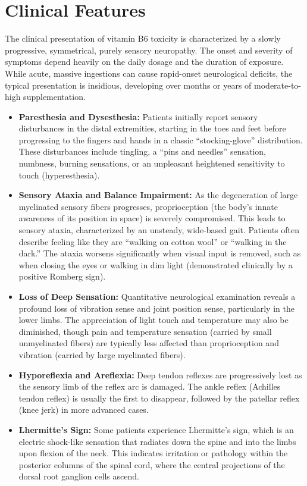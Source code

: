 \section*{Clinical Features}
The clinical presentation of vitamin B6 toxicity is characterized by a slowly progressive, symmetrical, purely sensory neuropathy. The onset and severity of symptoms depend heavily on the daily dosage and the duration of exposure. While acute, massive ingestions can cause rapid-onset neurological deficits, the typical presentation is insidious, developing over months or years of moderate-to-high supplementation.

\begin{itemize}
    \item \textbf{Paresthesia and Dysesthesia:} Patients initially report sensory disturbances in the distal extremities, starting in the toes and feet before progressing to the fingers and hands in a classic ``stocking-glove'' distribution. These disturbances include tingling, a ``pins and needles'' sensation, numbness, burning sensations, or an unpleasant heightened sensitivity to touch (hyperesthesia).
    \item \textbf{Sensory Ataxia and Balance Impairment:} As the degeneration of large myelinated sensory fibers progresses, proprioception (the body's innate awareness of its position in space) is severely compromised. This leads to sensory ataxia, characterized by an unsteady, wide-based gait. Patients often describe feeling like they are ``walking on cotton wool'' or ``walking in the dark.'' The ataxia worsens significantly when visual input is removed, such as when closing the eyes or walking in dim light (demonstrated clinically by a positive Romberg sign).
    \item \textbf{Loss of Deep Sensation:} Quantitative neurological examination reveals a profound loss of vibration sense and joint position sense, particularly in the lower limbs. The appreciation of light touch and temperature may also be diminished, though pain and temperature sensation (carried by small unmyelinated fibers) are typically less affected than proprioception and vibration (carried by large myelinated fibers).
    \item \textbf{Hyporeflexia and Areflexia:} Deep tendon reflexes are progressively lost as the sensory limb of the reflex arc is damaged. The ankle reflex (Achilles tendon reflex) is usually the first to disappear, followed by the patellar reflex (knee jerk) in more advanced cases.
    \item \textbf{Lhermitte's Sign:} Some patients experience Lhermitte's sign, which is an electric shock-like sensation that radiates down the spine and into the limbs upon flexion of the neck. This indicates irritation or pathology within the posterior columns of the spinal cord, where the central projections of the dorsal root ganglion cells ascend.

\end{itemize}
